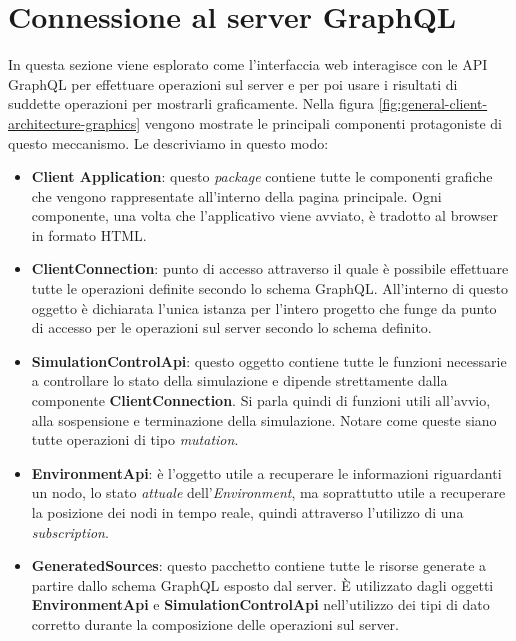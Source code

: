\section{Connessione al server GraphQL}\label{section:graphql-connection}
In questa sezione viene esplorato come l'interfaccia web interagisce con le \ac{API} GraphQL per effettuare operazioni sul server e per poi usare i risultati di suddette operazioni per mostrarli graficamente. Nella figura \ref{fig:general-client-architecture-graphics} vengono mostrate le principali componenti protagoniste di questo meccanismo. Le descriviamo in questo modo:

\begin{itemize}
	\item \textbf{Client Application}: questo \textit{package} contiene tutte le componenti grafiche che vengono rappresentate all'interno della pagina principale. Ogni componente, una volta che l'applicativo viene avviato, è tradotto al browser in formato HTML.
	\item \textbf{ClientConnection}: punto di accesso attraverso il quale è possibile effettuare tutte le operazioni definite secondo lo schema GraphQL. All'interno di questo oggetto è dichiarata l'unica istanza per l'intero progetto che funge da punto di accesso per le operazioni sul server secondo lo schema definito. 
	\item \textbf{SimulationControlApi}: questo oggetto contiene tutte le funzioni necessarie a controllare lo stato della simulazione e dipende strettamente dalla componente \textbf{ClientConnection}. Si parla quindi di funzioni utili all'avvio, alla sospensione e terminazione della simulazione. Notare come queste siano tutte operazioni di tipo \textit{mutation}.
	\item \textbf{EnvironmentApi}: è l'oggetto utile a recuperare le informazioni riguardanti un nodo, lo stato \textit{attuale} dell'\textit{Environment}, ma soprattutto utile a recuperare la posizione dei nodi in tempo reale, quindi attraverso l'utilizzo di una \textit{subscription}. 
	\item \textbf{GeneratedSources}\label{item:generated-sources}: questo pacchetto contiene tutte le risorse generate a partire dallo schema GraphQL esposto dal server. È utilizzato dagli oggetti \textbf{EnvironmentApi} e \textbf{SimulationControlApi} nell'utilizzo dei tipi di dato corretto durante la composizione delle operazioni sul server.
\end{itemize}

